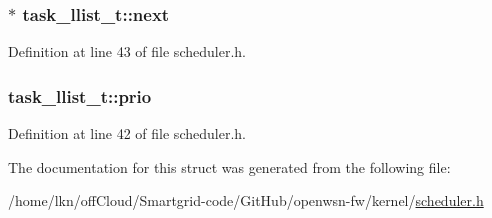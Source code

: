 \subsubsection[{\texorpdfstring{next}{next}}]{$\ast$ task\+\_\+llist\+\_\+t\+::next}\hypertarget{structtask__llist__t_a477d82d89c810ba1d2f5b79bf38f24a4}{}\label{structtask__llist__t_a477d82d89c810ba1d2f5b79bf38f24a4}


Definition at line 43 of file scheduler.\+h.

\subsubsection[{\texorpdfstring{prio}{prio}}]{ task\+\_\+llist\+\_\+t\+::prio}\hypertarget{structtask__llist__t_a03183c01a3847e5ba92c7861a98fc33e}{}\label{structtask__llist__t_a03183c01a3847e5ba92c7861a98fc33e}


Definition at line 42 of file scheduler.\+h.



The documentation for this struct was generated from the following file\+:\begin{DoxyCompactItemize}
\item 
/home/lkn/off\+Cloud/\+Smartgrid-\/code/\+Git\+Hub/openwsn-\/fw/kernel/\hyperlink{scheduler_8h}{scheduler.\+h}\end{DoxyCompactItemize}
